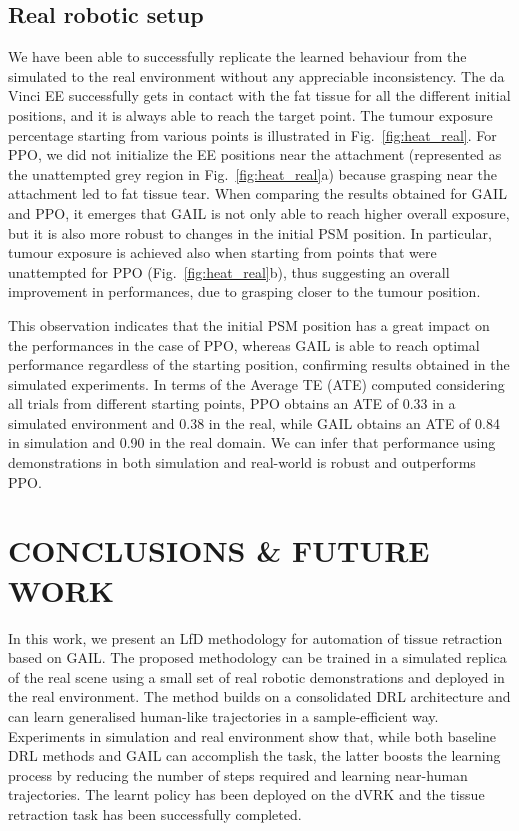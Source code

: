 \documentclass[letterpaper, 10 pt, conference]{ieeeconf}
\begin{document}
\subsection{Real robotic setup \label{sec:results_real}}
We have been able to successfully replicate the learned behaviour from the simulated to the real environment without any appreciable inconsistency. The da Vinci EE successfully gets in contact with the fat tissue for all the different initial positions, and it is always able to reach the target point. The tumour exposure percentage starting from various points is illustrated in Fig.~\ref{fig:heat_real}. 
For PPO, we did not initialize the EE positions near the attachment (represented as the unattempted grey region in Fig.~\ref{fig:heat_real}a) because grasping near the attachment led to fat tissue tear. 
When comparing the results obtained for GAIL and PPO, it emerges that GAIL is not only able to reach higher overall exposure, but it is also more robust to changes in the initial PSM position. In particular, tumour exposure is achieved also when starting from points that were unattempted for PPO (Fig.~\ref{fig:heat_real}b), thus suggesting an overall improvement in performances, due to grasping closer to the tumour position.

This observation indicates that the initial PSM position has a great impact on the performances in the case of PPO, whereas GAIL is able to reach optimal performance regardless of the starting position, confirming results obtained in the simulated experiments.
In terms of the Average TE (ATE) computed considering all trials from different starting points, PPO obtains an ATE of 0.33 in a simulated environment and 0.38 in the real, while GAIL obtains an ATE of 0.84 in simulation and 0.90 in the real domain. We can infer that performance using demonstrations in both simulation and real-world is robust and outperforms PPO.

\section{CONCLUSIONS \& FUTURE WORK\label{sec:conclusion}}

In this work, we present an LfD methodology for automation of tissue retraction based on GAIL. The proposed methodology can be trained in a simulated replica of the real scene using a small set of real robotic demonstrations and deployed in the real environment. The method builds on a consolidated DRL architecture and can learn generalised human-like trajectories in a sample-efficient way. Experiments in simulation and real environment show that, while both baseline DRL methods and GAIL can accomplish the task, the latter boosts the learning process by reducing the number of steps required and learning near-human trajectories. The learnt policy has been deployed on the dVRK and the tissue retraction task has been successfully completed.
\end{document}
